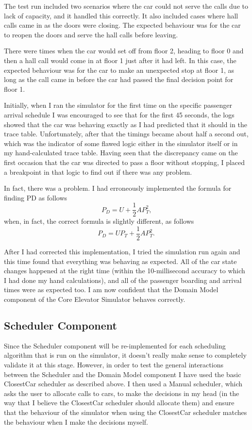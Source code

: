 \documentclass{UoYCSproject}
\begin{document}
The test run included two scenarios where the car could not serve the calls due to lack of capacity, and it handled this correctly.  It also included cases where hall calls came in as the doors were closing.  The expected behaviour was for the car to reopen the doors and serve the hall calls before leaving.

There were times when the car would set off from floor 2, heading to floor 0 and then a hall call would come in at floor 1 just after it had left.  In this case, the expected behaviour was for the car to make an unexpected stop at floor 1, as long as the call came in before the car had passed the final decision point for floor 1.

Initially, when I ran the simulator for the first time on the specific passenger arrival schedule I was encouraged to see that for the first 45 seconds, the logs showed that the car was behaving exactly as I had predicted that it should in the trace table.  Unfortunately, after that the timings became about half a second out, which was the indicator of some flawed logic either in the simulator itself or in my hand-calculated trace table.  Having seen that the discrepancy came on the first occasion that the car was directed to pass a floor without stopping, I placed a breakpoint in that logic to find out if there was any problem.

In fact, there was a problem.  I had erroneously implemented the formula for finding PD as follows
\[ P_D = U + \frac{1}{2}AP_T^2 \text{,} \]
when, in fact, the correct formula is slightly different, as follows
\[ P_D = UP_T + \frac{1}{2}AP_T^2 \text{.} \]

After I had corrected this implementation, I tried the simulation run again and this time found that everything was behaving as expected.  All of the car state changes happened at the right time (within the 10-millisecond accuracy to which I had done my hand calculations), and all of the passenger boarding and arrival times were as expected too.  I am now confident that the Domain Model component of the Core Elevator Simulator behaves correctly.

\subsection{Scheduler Component}

Since the Scheduler component will be re-implemented for each scheduling algorithm that is run on the simulator, it doesn’t really make sense to completely validate it at this stage.  However, in order to test the general interactions between the Scheduler and the Domain Model component I have used the basic ClosestCar scheduler as described above.  I then used a Manual scheduler, which asks the user to allocate calls to cars, to make the decisions in my head (in the way that I believe the ClosestCar scheduler should allocate them) and ensure that the behaviour of the simulator when using the ClosestCar scheduler matches the behaviour when I make the decisions myself.
\end{document}

